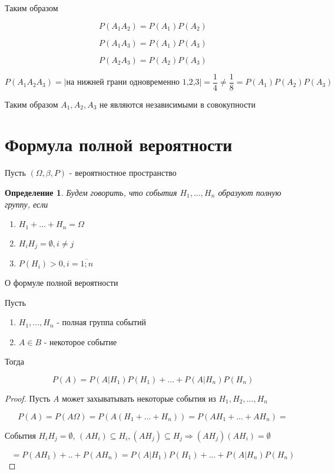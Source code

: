 \documentclass[a4paper, 14pt]{report}
\newtheorem{defenition}{Определение}[section]
\begin{document}
Таким образом

$$
P(A_1A_2) = P(A_1)P(A_2)
$$


$$
P(A_1A_3) = P(A_1)P(A_3)
$$

$$
P(A_2A_3) = P(A_2)P(A_3)
$$

$$
P(A_1A_2A_3) = |\text{на нижней грани одновременно 1,2,3}| = \frac{1}{4} \ne \frac{1}{8} = P(A_1)P(A_2)P(A_3)
$$

Таким образом $A_1,A_2,A_3$ не являются независимыми в совокупности

\section{Формула полной вероятности}

Пусть $(\Omega, \beta, P)$ - вероятностное пространство

\begin{defenition}
    Будем говорить, что события $H_1, ..., H_n$ образуют полную группу, если

    \begin{enumerate}
        \item $H_1 + ... + H_n = \Omega$
        \item $H_i H_j = \emptyset, i\ne j$
        \item $P(H_i) > 0, i = \overline{1;n}$
    \end{enumerate}
\end{defenition}

\begin{theorem}
    О формуле полной вероятности

    Пусть

    \begin{enumerate}
        \item $H_1,...,H_n$ - полная группа событий
        \item $A \in B$ - некоторое событие
    \end{enumerate}

    Тогда

    $$
    P(A) = P(A|H_1)P(H_1) + ... + P(A|H_n)P(H_n)
    $$
\end{theorem}

\begin{proof}
   Пусть $A$ может захыватывать некоторые события из $H_1,H_2,...,H_n$

   $$
   P(A) = P(A \Omega) = P(A(H_1+...+H_n)) = P(AH_1 + ... + AH_n) = 
   $$

   События $H_iH_j = \emptyset$, $(AH_i) \subseteq H_i, (AH_j) \subseteq H_j  \Rightarrow (AH_j)(AH_i) = \emptyset$

   $$
   = P(AH_1) + .. + P(AH_n) = P(A|H_1)P(H_1) + ... + P(A|H_n)P(H_n)
   $$
\end{proof}
\end{document}
